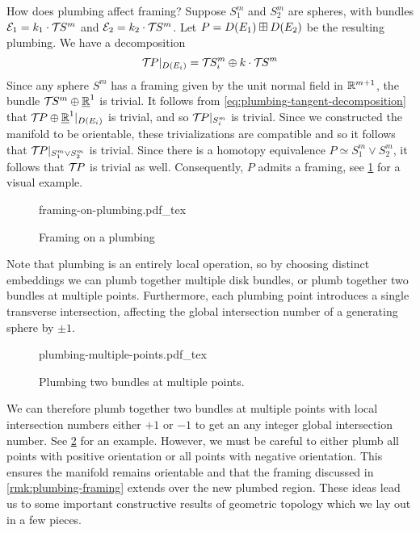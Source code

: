 \begin{remark}\label{rmk:plumbing-framing}
	How does plumbing affect framing? Suppose $S_1^m$ and $S_2^m$ are spheres, with bundles $\mathcal{E}_1 = k_1\cdot {\mathcal{T}\hspace{-0.1em}} S^m$ and $\mathcal{E}_2=k_2\cdot {\mathcal{T}\hspace{-0.1em}} S^m$. Let $P=D(E_1)\boxplus D(E_2)$ be the resulting plumbing. We have a decomposition
	\begin{equation}\label{eq:plumbing-tangent-decomposition}
		{\mathcal{T}\hspace{-0.1em}} P|_{D(E_i)} = {\mathcal{T}\hspace{-0.1em}} S^m_i\oplus k\cdot {\mathcal{T}\hspace{-0.1em}} S^m
	\end{equation}
	Since any sphere $S^m$ has a framing given by the unit normal field in $\mathbb{R}^{m+1}$, the bundle ${\mathcal{T}\hspace{-0.1em}} S^m\oplus\underline{\mathbb{R}}^1$ is trivial.
	It follows from \cref{eq:plumbing-tangent-decomposition} that ${\mathcal{T}\hspace{-0.1em}} P\oplus \underline{\mathbb{R}}^1|_{D(E_i)}$ is trivial, and so ${\mathcal{T}\hspace{-0.1em}} P|_{S_i^m}$ is trivial. Since we constructed the manifold to be orientable, these trivializations are compatible and so it follows that ${\mathcal{T}\hspace{-0.1em}} P|_{S_1^m\vee S_2^m}$ is trivial. Since there is a homotopy equivalence $P\simeq S_1^m\vee S_2^m$, it follows that ${\mathcal{T}\hspace{-0.1em}} P$ is trivial as well. Consequently, $P$ admits a framing, see \cref{fig:framing-of-plumbed-manifold} for a visual example.
	\begin{figure}[ht]
		\centering
		{framing-on-plumbing.pdf_tex}
		\caption{Framing on a plumbing}\label{fig:framing-of-plumbed-manifold}
	\end{figure}
\end{remark}

Note that plumbing is an entirely local operation, so by choosing distinct embeddings we can plumb together multiple disk bundles, or plumb together two bundles at multiple points. Furthermore, each plumbing point introduces a single transverse intersection, affecting the global intersection number of a generating sphere by $\pm 1$.
\begin{figure}[ht]
	\centering
	{plumbing-multiple-points.pdf_tex}
	\caption{Plumbing two bundles at multiple points.}\label{fig:plumbing-at-multiple-points}
\end{figure}
We can therefore plumb together two bundles at multiple points with local intersection numbers either $+1$ or $-1$ to get an any integer global intersection number. See \cref{fig:plumbing-at-multiple-points} for an example. However, we must be careful to either plumb all points with positive orientation or all points with negative orientation. This ensures the manifold remains orientable and that the framing discussed in \cref{rmk:plumbing-framing} extends over the new plumbed region.
These ideas lead us to some important constructive results of geometric topology which we lay out in a few pieces.

